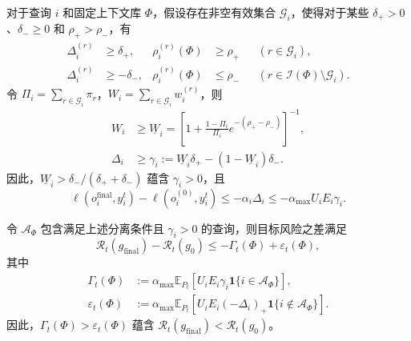\begin{theorem}[加权上下文聚合的风险界]
\label{thm:effective_context_repair}
对于查询 $i$ 和固定上下文库 $\Phi$，假设存在非空有效集合 $\mathcal G_i$，使得对于某些 $\delta_+>0$、$\delta_-\geq0$ 和 $\rho_+>\rho_-$，有
\begin{equation}
\begin{aligned}
\Delta_i^{(r)}&\geq\delta_+,&\rho_i^{(r)}(\Phi)&\geq\rho_+&& (r\in\mathcal G_i),\\
\Delta_i^{(r)}&\geq-\delta_-,&\rho_i^{(r)}(\Phi)&\leq\rho_-&& (r\in\mathcal I(\Phi)\setminus\mathcal G_i).
\end{aligned}
\label{eq:repair_conditions}
\end{equation}
令 $\Pi_i=\sum_{r\in\mathcal G_i}\pi_r$，$W_i=\sum_{r\in\mathcal G_i}w_i^{(r)}$，则
\begin{equation}
\begin{aligned}
W_i&\geq\underline W_i
=\left[1+\frac{1-\Pi_i}{\Pi_i}
e^{-(\rho_+-\rho_-)}\right]^{-1},\\
\Delta_i&\geq\gamma_i
:=\underline W_i\delta_+-(1-\underline W_i)\delta_-.
\end{aligned}
\label{eq:repair_margin}
\end{equation}
因此，$\underline W_i>\delta_-/(\delta_++\delta_-)$ 蕴含 $\gamma_i>0$，且
\begin{equation}
  \ell(o_i^{\mathrm{final}},y_i^t)-\ell(o_i^{(0)},y_i^t)
  \leq-\alpha_i\Delta_i
  \leq-\alpha_{\max}U_iE_i\gamma_i.
  \label{eq:query_repair_gain}
\end{equation}

令 $\mathcal A_\Phi$ 包含满足上述分离条件且 $\gamma_i>0$ 的查询，则目标风险之差满足
\begin{equation}
  \mathcal R_t(g_{\mathrm{final}})-\mathcal R_t(g_0)
  \leq-\Gamma_t(\Phi)+\varepsilon_t(\Phi),
  \label{eq:changed_risk_gain}
\end{equation}
其中
\begin{equation}
\begin{aligned}
\Gamma_t(\Phi)
&:=\alpha_{\max}\mathbb E_{P_t}
  [U_iE_i\gamma_i\mathbf 1\{i\in\mathcal A_\Phi\}],\\
\varepsilon_t(\Phi)
&:=\alpha_{\max}\mathbb E_{P_t}
  [U_iE_i(-\Delta_i)_+\mathbf 1\{i\notin\mathcal A_\Phi\}].
\end{aligned}
\label{eq:repair_residual_terms}
\end{equation}
因此，$\Gamma_t(\Phi)>\varepsilon_t(\Phi)$ 蕴含 $\mathcal R_t(g_{\mathrm{final}})<\mathcal R_t(g_0)$。
\end{theorem}

